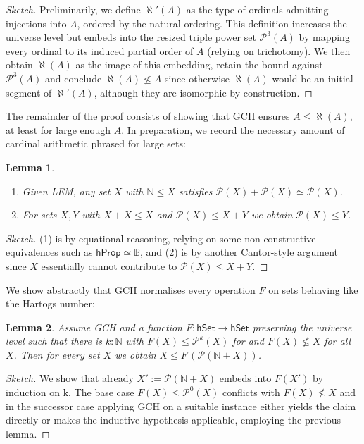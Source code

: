 \documentclass{easychair}
\newcommand{\nat}{\mathbb{N}}
\newcommand{\bool}{\mathbb{B}}
\newcommand{\pow}{\mathcal{P}}
\newcommand{\hprop}{\mathsf{hProp}}
\newcommand{\hset}{\mathsf{hSet}}
\newtheorem{lemma}{Lemma}
\begin{document}
\begin{proof}[Sketch]
	Preliminarily, we define $\aleph'(A)$ as the type of ordinals admitting injections into $A$, ordered by the natural ordering.
	This definition increases the universe level but embeds into the resized triple power set $\pow^3(A)$ by mapping every ordinal to its induced partial order of $A$ (relying on trichotomy).
	We then obtain $\aleph(A)$ as the image of this embedding, retain the bound against $\pow^3(A)$ and conclude $\aleph(A)\not\le A$ since otherwise $\aleph(A)$ would be an initial segment of $\aleph'(A)$, although they are isomorphic by construction.
\end{proof}

The remainder of the proof consists of showing that GCH ensures $A\le\aleph(A)$, at least for large enough $A$.
In preparation, we record the necessary amount of cardinal arithmetic phrased for large sets:

\begin{lemma}
	\label{cardinals}
	\begin{enumerate}[noitemsep]
		\item
		Given LEM, any set $X$ with $\nat\le X$ satisfies $\pow(X)+\pow(X)\simeq \pow(X)$.
		\item
		For sets $X,Y$ with $X+X\le X$ and $\pow (X)\le X+Y$ we obtain $\pow (X)\le Y$.
	\end{enumerate}
\end{lemma}
\begin{proof}[Sketch]
	(1) is by equational reasoning, relying on some non-constructive equivalences such as $\hprop\simeq\bool$, and (2) is by another Cantor-style argument since $X$ essentially cannot contribute to $\pow (X)\le X+Y$.
\end{proof}

We show abstractly that GCH normalises every operation $F$ on sets behaving like the Hartogs number:

\begin{lemma}
	\label{sierpinski}
	Assume GCH and a function $F:\hset\to\hset$ preserving the universe level such that there is $k:\nat$ with $F(X)\le \pow^k(X)$ for and $F(X)\not\le X$ for all $X$.
	Then for every set $X$ we obtain $X\le F\,(\pow(\nat + X))$.
\end{lemma}

\begin{proof}[Sketch]
	We show that already $X':=\pow(\nat + X)$ embeds into $F(X')$ by induction on k.
	The base case $F(X)\le \pow^0(X)$ conflicts with $F(X)\not\le X$ and in the successor case applying GCH on a suitable instance either yields the claim directly or makes the inductive hypothesis applicable, employing the previous lemma.
\end{proof}
\end{document}
